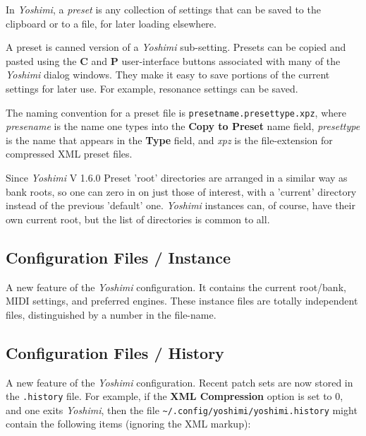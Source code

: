    In \textsl{Yoshimi}, a
   \textsl{preset} is any collection of settings that can be saved to the
   clipboard or to a file, for later loading elsewhere.

   A preset is canned version of a \textsl{Yoshimi} sub-setting.  Presets can be
   copied and pasted using the \textbf{C} and \textbf{P} user-interface buttons
   associated with many of the \textsl{Yoshimi} dialog windows.  They make it
   easy to save portions of the current settings for later use.  For example,
   resonance settings can be saved.

   The naming convention for a preset file is
   \texttt{presetname.presettype.xpz}, where
   \textsl{presename} is the name one types into the \textbf{Copy to Preset}
   name field, \textsl{presettype} is the name that appears in the
   \textbf{Type} field, and \textsl{xpz} is the file-extension for compressed
   XML preset files.

   Since \textsl{Yoshimi} V 1.6.0 Preset 'root' directories are arranged in a similar way as bank roots, so one can zero in on just those of interest, with a 'current' directory instead of the previous 'default' one. \textsl{Yoshimi} instances can, of course, have their own current root, but the list of directories is common to all.


\subsection{Configuration Files / Instance}
\label{subsec:configuration_instance}

   A new feature of the \textsl{Yoshimi} configuration.
   It contains the current root/bank, MIDI settings, and preferred engines.
   These instance files are totally independent files, distinguished by a number
   in the file-name.

\subsection{Configuration Files / History}
\label{subsec:configuration_history}

   A new feature of the \textsl{Yoshimi} configuration.
   Recent patch sets are now stored in the \texttt{.history} file.
   For example, if the \textbf{XML Compression} option is set to 0, and one
   exits \textsl{Yoshimi}, then the file
   \texttt{\textasciitilde/.config/yoshimi/yoshimi.history} might
   contain the following items (ignoring the XML markup):

